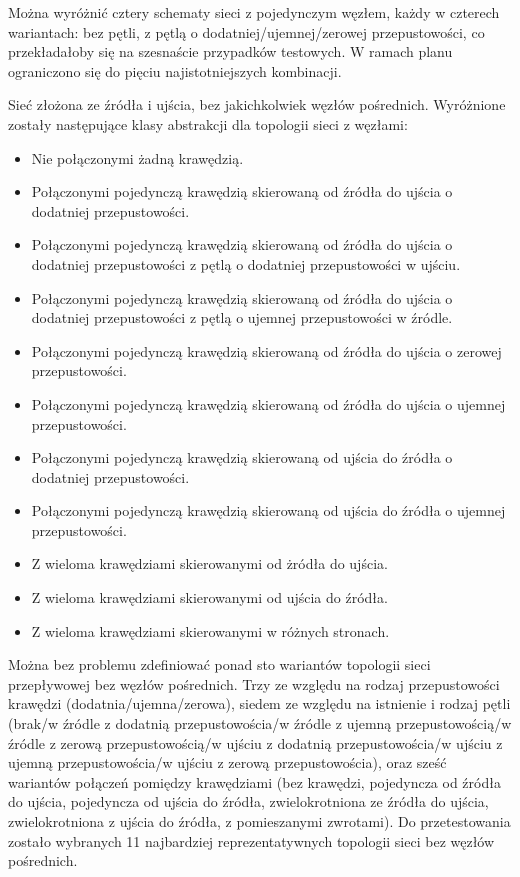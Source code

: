 \documentclass[10pt]{dokument-tiwo}
\begin{document}
Można wyróżnić cztery schematy sieci z pojedynczym węzłem, każdy w czterech wariantach: bez pętli, z pętlą o dodatniej/ujemnej/zerowej przepustowości, co przekładałoby się na szesnaście przypadków testowych. W ramach planu ograniczono się do pięciu najistotniejszych kombinacji.

Sieć złożona ze źródła i ujścia, bez jakichkolwiek węzłów pośrednich. Wyróżnione zostały następujące klasy abstrakcji dla topologii sieci z węzłami:
\begin{itemize}
    \item Nie połączonymi żadną krawędzią.
    \item Połączonymi pojedynczą krawędzią skierowaną od źródła do ujścia o dodatniej przepustowości.
    \item Połączonymi pojedynczą krawędzią skierowaną od źródła do ujścia o dodatniej przepustowości z pętlą o dodatniej przepustowości w ujściu.
    \item Połączonymi pojedynczą krawędzią skierowaną od źródła do ujścia o dodatniej przepustowości z pętlą o ujemnej przepustowości w źródle.
    \item Połączonymi pojedynczą krawędzią skierowaną od źródła do ujścia o zerowej przepustowości.
    \item Połączonymi pojedynczą krawędzią skierowaną od źródła do ujścia o ujemnej przepustowości.
    \item Połączonymi pojedynczą krawędzią skierowaną od ujścia do źródła o dodatniej przepustowości.
    \item Połączonymi pojedynczą krawędzią skierowaną od ujścia do źródła o ujemnej przepustowości.
    \item Z wieloma krawędziami skierowanymi od żródła do ujścia.
    \item Z wieloma krawędziami skierowanymi od ujścia do źródła.
    \item Z wieloma krawędziami skierowanymi w różnych stronach.
\end{itemize}
Można bez problemu zdefiniować ponad sto wariantów topologii sieci przepływowej bez węzłów pośrednich. Trzy ze względu na rodzaj przepustowości krawędzi (dodatnia/ujemna/zerowa), siedem ze względu na istnienie i rodzaj pętli (brak/w źródle z dodatnią przepustowościa/w źródle z ujemną przepustowością/w źródle z zerową przepustowością/w ujściu z dodatnią przepustowościa/w ujściu z ujemną przepustowościa/w ujściu z zerową przepustowościa), oraz sześć wariantów połączeń pomiędzy krawędziami (bez krawędzi, pojedyncza od źródła do ujścia, pojedyncza od ujścia do źródła, zwielokrotniona ze źródła do ujścia, zwielokrotniona z ujścia do źródła, z pomieszanymi zwrotami). Do przetestowania zostało wybranych 11 najbardziej reprezentatywnych topologii sieci bez węzłów pośrednich.
\end{document}
